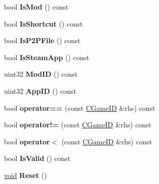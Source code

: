 \begin{DoxyCompactItemize}
\item 
\hypertarget{classCGameID_ab008a82b9cc3ac17d74343077a9c22c1}{}bool {\bfseries Is\+Mod} () const \label{classCGameID_ab008a82b9cc3ac17d74343077a9c22c1}

\item 
\hypertarget{classCGameID_adf682a287d4b8a7e75ab2bb5b0af8a49}{}bool {\bfseries Is\+Shortcut} () const \label{classCGameID_adf682a287d4b8a7e75ab2bb5b0af8a49}

\item 
\hypertarget{classCGameID_adb9ccd1964e1307101532f2e1245f63f}{}bool {\bfseries Is\+P2\+P\+File} () const \label{classCGameID_adb9ccd1964e1307101532f2e1245f63f}

\item 
\hypertarget{classCGameID_a9f69a4a43a53608ac6c376d2e6ec27c4}{}bool {\bfseries Is\+Steam\+App} () const \label{classCGameID_a9f69a4a43a53608ac6c376d2e6ec27c4}

\item 
\hypertarget{classCGameID_abbd2340fd4e8c237264be18b6a98f6fb}{}uint32 {\bfseries Mod\+I\+D} () const \label{classCGameID_abbd2340fd4e8c237264be18b6a98f6fb}

\item 
\hypertarget{classCGameID_a331ea93af4d6ff0e24913f39b92467fe}{}uint32 {\bfseries App\+I\+D} () const \label{classCGameID_a331ea93af4d6ff0e24913f39b92467fe}

\item 
\hypertarget{classCGameID_a69684f6ac11ff6a41446cff82beaa022}{}bool {\bfseries operator==} (const \hyperlink{classCGameID}{C\+Game\+I\+D} \&rhs) const \label{classCGameID_a69684f6ac11ff6a41446cff82beaa022}

\item 
\hypertarget{classCGameID_a1d75dfbe7c0496413860df614d631796}{}bool {\bfseries operator!=} (const \hyperlink{classCGameID}{C\+Game\+I\+D} \&rhs) const \label{classCGameID_a1d75dfbe7c0496413860df614d631796}

\item 
\hypertarget{classCGameID_a6b07e2ed5932d0617ad466fa67f62c83}{}bool {\bfseries operator$<$} (const \hyperlink{classCGameID}{C\+Game\+I\+D} \&rhs) const \label{classCGameID_a6b07e2ed5932d0617ad466fa67f62c83}

\item 
\hypertarget{classCGameID_ad5a03abe7b45695e0834f1820a376839}{}bool {\bfseries Is\+Valid} () const \label{classCGameID_ad5a03abe7b45695e0834f1820a376839}

\item 
\hypertarget{classCGameID_aa9cc9ed21dcbcaa0d353d606e29d08ab}{}\hyperlink{SDL__audio_8h_a52835ae37c4bb905b903cbaf5d04b05f}{void} {\bfseries Reset} ()\label{classCGameID_aa9cc9ed21dcbcaa0d353d606e29d08ab}

\end{DoxyCompactItemize}
